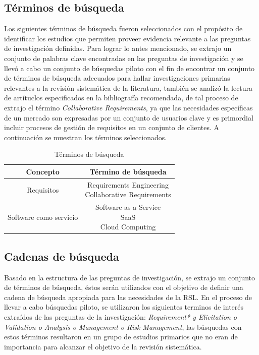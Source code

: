 \documentclass{article}
\begin{document}
\subsection{Términos de búsqueda}
Los siguientes términos de búsqueda fueron seleccionados con el propósito de identificar los estudios que 
permiten proveer evidencia relevante a las preguntas de investigación definidas. 
Para lograr lo antes mencionado, se extrajo un conjunto de palabras clave encontradas en las 
preguntas de investigación y se llevó a cabo un conjunto de búsquedas piloto con el fin de encontrar
un conjunto de términos de búsqueda adecuados para hallar investigaciones primarias relevantes a 
la revisión sistemática de la literatura, también se analizó la lectura de artítuclos especificados en la bibliografía recomendada, 
de tal proceso de extrajo el término \emph{Collaborative Requirements}, ya que las necesidades 
específicas de un mercado son expresadas por un conjunto de usuarios clave y es primordial incluir procesos de gestión de requisitos 
en un conjunto de clientes.
A continuación se muestran los términos seleccionados.

\begin{table}[ht]
        \caption{Términos de búsqueda} 
        \centering 
        \begin{tabular}{c c}
                \hline
                Concepto & Término de búsqueda\\ [0.5ex] %
                \hline
                Requisitos             & \makecell{Requirements Engineering \\
                                                   Collaborative Requirements} \\
                \hline 
                Software como servicio & \makecell{Software as a Service \\
                                                   SaaS \\
                                                   Cloud Computing }\\ [1ex]
                \hline 
        \end{tabular}
        \label{table:tablaterminos}
\end{table}
\newpage

\subsection{Cadenas de búsqueda}
Basado en la estructura de las preguntas de investigación, se extrajo un conjunto de 
términos de búsqueda, éstos serán utilizados con el objetivo de definir una cadena de búsqueda apropiada para 
las necesidades de la RSL. 
En el proceso de llevar a cabo búsquedas piloto, se utilizaron los siguientes terminos de interés extraídos de las preguntas de la investigación: 
\emph{Requirement* y Elicitation o Validation o Analysis o Management o Risk Management}, las búsquedas con estos 
términos resultaron en un grupo de estudios primarios que no eran de importancia para alcanzar el objetivo de la 
revisión sistemática. 
\end{document}
